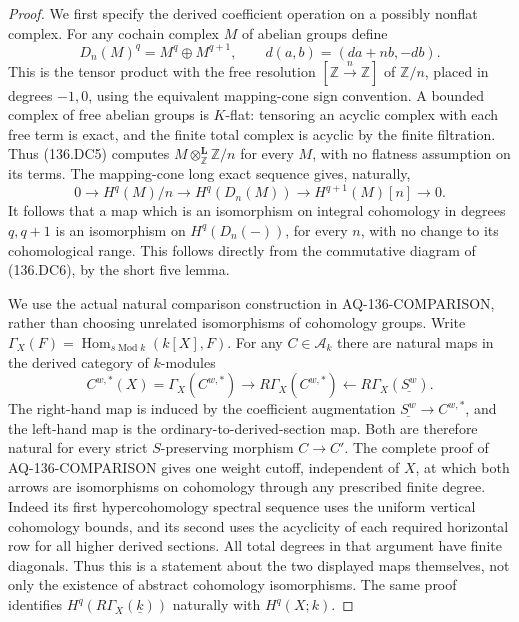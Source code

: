 \begin{proof}
We first specify the derived coefficient operation on a
possibly nonflat complex.  For any cochain complex $M$ of
abelian groups define
\[
 D_n(M)^q=M^q\oplus M^{q+1},\qquad
 d(a,b)=(da+n b,-db).
                                                               \tag{136.DC5}
\]
This is the tensor product with the free resolution
$[\mathbb Z\xrightarrow{n}\mathbb Z]$ of $\mathbb Z/n$,
placed in degrees $-1,0$, using the equivalent mapping-cone
sign convention.  A bounded complex of free abelian groups
is $K$-flat: tensoring an acyclic complex with each free
term is exact, and the finite total complex is acyclic by
the finite filtration.  Thus (136.DC5) computes
$M\otimes^{\mathbf L}_{\mathbb Z}\mathbb Z/n$ for every
$M$, with no flatness assumption on its terms.
The mapping-cone long exact sequence gives, naturally,
\[
 0\longrightarrow H^q(M)/n
 \longrightarrow H^q(D_n(M))
 \longrightarrow H^{q+1}(M)[n]\longrightarrow0.
                                                               \tag{136.DC6}
\]
It follows that a map which is an isomorphism on integral
cohomology in degrees $q,q+1$ is an isomorphism on
$H^q(D_n(-))$, for every $n$, with no change to its
cohomological range.  This follows directly from the
commutative diagram of (136.DC6), by the short five lemma.

We use the actual natural comparison construction in
AQ-136-COMPARISON, rather than choosing unrelated
isomorphisms of cohomology groups.  Write
$\Gamma_X(F)=\operatorname{Hom}_{s\operatorname{Mod}k}(k[X],F)$.
For any $C\in\mathcal A_k$ there are natural maps in the
derived category of $k$-modules
\[
 C^{w,*}(X)=\Gamma_X(C^{w,*})
       \longrightarrow R\Gamma_X(C^{w,*})
       \longleftarrow R\Gamma_X(\underline{S^w}).
                                                               \tag{136.DC7}
\]
The right-hand map is induced by the coefficient
augmentation $\underline{S^w}\to C^{w,*}$, and the
left-hand map is the ordinary-to-derived-section map.
Both are therefore natural for every strict
$S$-preserving morphism $C\to C'$.
The complete proof of AQ-136-COMPARISON gives one weight
cutoff, independent of $X$, at which both arrows are
isomorphisms on cohomology through any prescribed finite
degree.  Indeed its first hypercohomology spectral sequence
uses the uniform vertical cohomology bounds, and its
second uses the acyclicity of each required horizontal
row for all higher derived sections.  All total degrees
in that argument have finite diagonals.  Thus this is a
statement about the two displayed maps themselves, not
only the existence of abstract cohomology isomorphisms.
The same proof identifies
$H^q(R\Gamma_X(\underline{k}))$ naturally with $H^q(X;k)$.


\end{proof}
